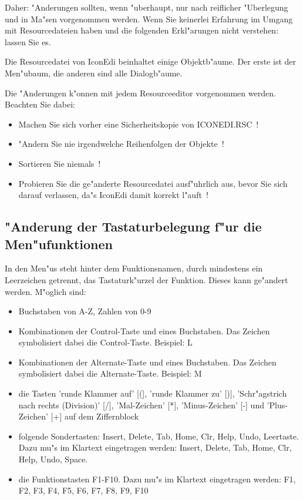 Daher: "Anderungen sollten, wenn "uberhaupt, nur nach reiflicher
"Uberlegung und in Ma"sen vorgenommen werden. Wenn Sie keinerlei
Erfahrung im Umgang mit Resourcedateien haben und die folgenden
Erkl"arungen nicht verstehen: lassen Sie es. 

Die Resourcedatei von IconEdi beinhaltet einige Objektb"aume. Der 
erste ist der Men"ubaum, die anderen sind alle Dialogb"aume.

Die "Anderungen k"onnen mit jedem Resourceeditor vorgenommen werden.
Beachten Sie dabei:
\begin{itemize}
 \item Machen Sie sich vorher eine Sicherheitskopie von ICONEDI.RSC~!
 \item "Andern Sie nie irgendwelche Reihenfolgen der Objekte~!
 \item Sortieren Sie niemals~!
 \item Probieren Sie die ge"anderte Resourcedatei ausf"uhrlich aus,
       bevor Sie sich darauf verlassen, da"s IconEdi damit korrekt 
       l"auft~!
\end{itemize}

\subsection{"Anderung der Tastaturbelegung f"ur die Men"ufunktionen}
In den Men"us steht hinter dem Funktionsnamen, durch mindestens
ein Leerzeichen getrennt, das Tastaturk"urzel der Funktion. Dieses
kann ge"andert werden. M"oglich sind:
\begin{itemize}
 \item Buchstaben von A-Z, Zahlen von 0-9
 \item Kombinationen der Control-Taste und eines Buchstaben. Das
       Zeichen {\control} symbolisiert dabei die Control-Taste.
       Beispiel: {\control}L
 \item Kombinationen der Alternate-Taste und eines Buchstaben. Das
       Zeichen {\alternate} symbolisiert dabei die Alternate-Taste.
       Beispiel: {\alternate}M
 \item die Tasten 'runde Klammer auf' [(], 'runde Klammer zu' [)],
       'Schr"agstrich nach rechts (Division)' [/], 'Mal-Zeichen' [*],
       'Minus-Zeichen' [-] und 'Plus-Zeichen' [+] auf dem 
       Ziffernblock
 \item folgende Sondertasten: Insert, Delete, Tab, Home, Clr, Help,
       Undo, Leertaste. Dazu mu"s im Klartext eingetragen werden:
       Insert, Delete, Tab, Home, Clr, Help, Undo, Space.
 \item die Funktionstasten F1-F10. Dazu mu"s im Klartext eingetragen
       werden: F1, F2, F3, F4, F5, F6, F7, F8, F9, F10
\end{itemize}

